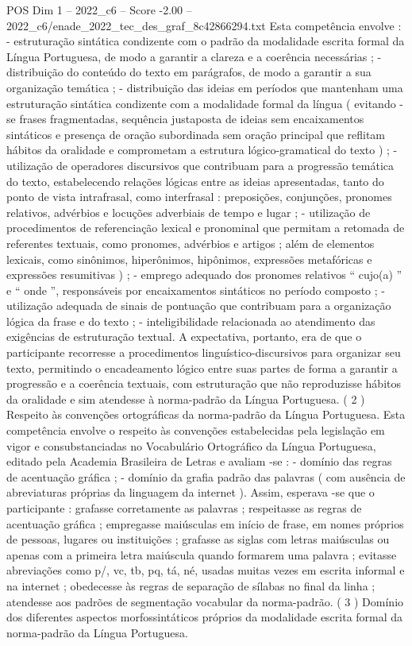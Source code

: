\begin{textsample}{POS Dim 1 – 2022\_c6 – Score -2.00 – 2022\_c6/enade\_2022\_tec\_des\_graf\_8c42866294.txt}
Esta competência envolve : - estruturação sintática condizente com o padrão da modalidade escrita formal da Língua Portuguesa, de modo a garantir a clareza e a coerência necessárias ; - distribuição do conteúdo do texto em parágrafos, de modo a garantir a sua organização temática ; - distribuição das ideias em períodos que mantenham uma estruturação sintática condizente com a modalidade formal da língua ( evitando -se frases fragmentadas, sequência justaposta de ideias sem encaixamentos sintáticos e presença de oração subordinada sem oração principal que reflitam hábitos da oralidade e comprometam a estrutura lógico-gramatical do texto ) ; - utilização de operadores discursivos que contribuam para a progressão temática do texto, estabelecendo relações lógicas entre as ideias apresentadas, tanto do ponto de vista intrafrasal, como interfrasal : preposições, conjunções, pronomes relativos, advérbios e locuções adverbiais de tempo e lugar ; - utilização de procedimentos de referenciação lexical e pronominal que permitam a retomada de referentes textuais, como pronomes, advérbios e artigos ; além de elementos lexicais, como sinônimos, hiperônimos, hipônimos, expressões metafóricas e expressões resumitivas ) ; - emprego adequado dos pronomes relativos “ cujo(a) ” e “ onde ”, responsáveis por encaixamentos sintáticos no período composto ; - utilização adequada de sinais de pontuação que contribuam para a organização lógica da frase e do texto ; - inteligibilidade relacionada ao atendimento das exigências de estruturação textual.
A expectativa, portanto, era de que o participante recorresse a procedimentos linguístico-discursivos para organizar seu texto, permitindo o encadeamento lógico entre suas partes de forma a garantir a progressão e a coerência textuais, com estruturação que não reproduzisse hábitos da oralidade e sim atendesse à norma-padrão da Língua Portuguesa. ( 2 ) Respeito às convenções ortográficas da norma-padrão da Língua Portuguesa.
Esta competência envolve o respeito às convenções estabelecidas pela legislação em vigor e consubstanciadas no Vocabulário Ortográfico da Língua Portuguesa, editado pela Academia Brasileira de Letras e avaliam -se : - domínio das regras de acentuação gráfica ; - domínio da grafia padrão das palavras ( com ausência de abreviaturas próprias da linguagem da internet ).
Assim, esperava -se que o participante : grafasse corretamente as palavras ; respeitasse as regras de acentuação gráfica ; empregasse maiúsculas em início de frase, em nomes próprios de pessoas, lugares ou instituições ; grafasse as siglas com letras maiúsculas ou apenas com a primeira letra maiúscula quando formarem uma palavra ; evitasse abreviações como p/, vc, tb, pq, tá, né, usadas muitas vezes em escrita informal e na internet ; obedecesse às regras de separação de sílabas no final da linha ; atendesse aos padrões de segmentação vocabular da norma-padrão. ( 3 ) Domínio dos diferentes aspectos morfossintáticos próprios da modalidade escrita formal da norma-padrão da Língua Portuguesa.

\end{textsample}
